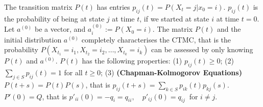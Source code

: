 The transition matrix $P(t)$ has entries 
$p_{ij}(t) = P(X_t = j | x_0 = i).$  
$p_{ij}(t)$ is the probability of being at state $j$ at time $t$, if we started at state $i$ at time $t=0$.
 Let $a^{(0)}$ be a vector, and $a^{(0)}_i := P(X_0 = i)$.
 The matrix $P(t)$ and the initial distribution $a^{(0)}$ completely characterises the CTMC, that is the probability 
$P(X_{t_1} = i_1, X_{t_2} = i_2, \ldots, X_{t_k} = i_k)$
can be assessed by only knowing $P(t)$ and $a^{(0)}$.
 $P(t)$ has the following properties:
(1) $p_{ij}(t) \ge 0$;
(2) $\sum_{j \in S}p_{ij}(t) = 1$ for all $t \ge 0$;
(3) \textbf{(Chapman-Kolmogorov Equations)} 
$P(t + s) = P(t)P(s)$, that is $p_{ij}(t+s) = \sum_{k \in S} p_{ik}(t) p_{kj}(s).$
 $P'(0) = Q$, that is 
$p'_{ii}(0) = -q_i = q_{ii}, \quad p'_{ij}(0) = q_{ij}\ $ for $i \ne j.$
